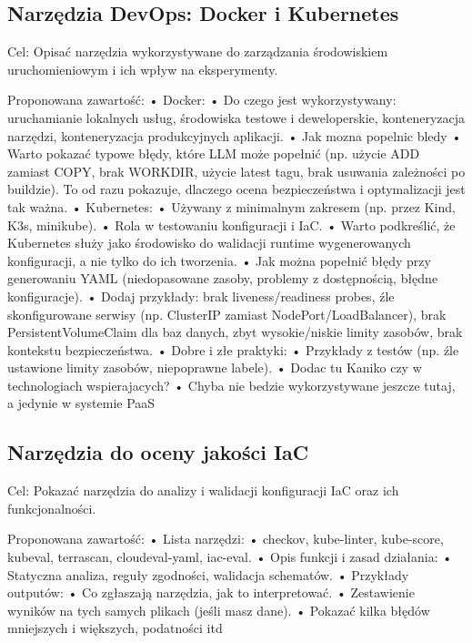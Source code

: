 \subsection{Narzędzia DevOps: Docker i Kubernetes}

Cel: Opisać narzędzia wykorzystywane do zarządzania środowiskiem uruchomieniowym i ich wpływ na eksperymenty.

Proponowana zawartość:
	•	Docker:
	•	    Do czego jest wykorzystywany: uruchamianie lokalnych usług, środowiska testowe i deweloperskie, konteneryzacja narzędzi, konteneryzacja produkcyjnych aplikacji.
	•	    Jak mozna popelnic bledy
	•		Warto pokazać typowe błędy, które LLM może popełnić (np. użycie ADD zamiast COPY, brak WORKDIR, użycie latest tagu, brak usuwania zależności po buildzie). To od razu pokazuje, dlaczego ocena bezpieczeństwa i optymalizacji jest tak ważna.
	•	Kubernetes:
	•	    Używany z minimalnym zakresem (np. przez Kind, K3s, minikube).
	•	    Rola w testowaniu konfiguracji i IaC.
	•		Warto podkreślić, że Kubernetes służy jako środowisko do walidacji runtime wygenerowanych konfiguracji, a nie tylko do ich tworzenia.
	•	    Jak można popełnić błędy przy generowaniu YAML (niedopasowane zasoby, problemy z dostępnością, błędne konfiguracje).
	•		Dodaj przykłady: brak liveness/readiness probes, źle skonfigurowane serwisy (np. ClusterIP zamiast NodePort/LoadBalancer), brak PersistentVolumeClaim dla baz danych, zbyt wysokie/niskie limity zasobów, brak kontekstu bezpieczeństwa.
	•	Dobre i złe praktyki:
	•	    Przykłady z testów (np. źle ustawione limity zasobów, niepoprawne labele).
	•   Dodac tu Kaniko czy w technologiach wspierajacych?
	•	Chyba nie bedzie wykorzystywane jeszcze tutaj, a jedynie w systemie PaaS



\subsection{Narzędzia do oceny jakości IaC}

Cel: Pokazać narzędzia do analizy i walidacji konfiguracji IaC oraz ich funkcjonalności.

Proponowana zawartość:
	•	Lista narzędzi:
	•	    checkov, kube-linter, kube-score, kubeval, terrascan, cloudeval-yaml, iac-eval.
	•	Opis funkcji i zasad działania:
	•	    Statyczna analiza, reguły zgodności, walidacja schematów.
	•	Przykłady outputów:
	•	    Co zgłaszają narzędzia, jak to interpretować.
	•	    Zestawienie wyników na tych samych plikach (jeśli masz dane).
	•		Pokazać kilka błędów mniejszych i większych, podatności itd



